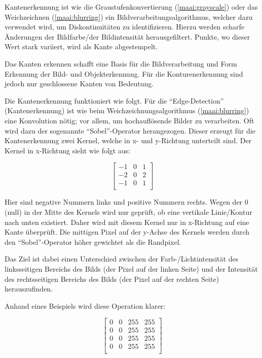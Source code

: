 Kantenerkennung ist wie die Graustufenkonvertierung (\ref{maai:grayscale}) oder das Weichzeichnen (\ref{maai:blurring}) ein Bildverarbeitungsalgorithmus, welcher dazu verwendet wird, um Diskontinuitäten zu identifizieren. Hierzu werden scharfe Änderungen der Bildfarbe/der Bildintensität herausgefiltert. Punkte, wo dieser Wert stark variiert, wird als Kante abgestempelt.

Das Kanten erkennen schafft eine Basis für die Bildverarbeitung und Form Erkennung der Bild- und Objekterkennung. Für die Konturenerkennung sind jedoch nur geschlossene Kanten von Bedeutung.

Die Kantenerkennung funktioniert wie folgt. Für die ``Edge-Detection'' (Kantenerkennung) ist wie beim Weichzeichnungsalgorithmus (\ref{maai:blurring}) eine Konvolution nötig; vor allem, um hochauflösende Bilder zu verarbeiten. Oft wird dazu der sogenannte ``Sobel''-Operator herangezogen. Dieser erzeugt für die Kantenerkennung zwei Kernel, welche in x- und y-Richtung unterteilt sind. Der Kernel in x-Richtung sieht wie folgt aus:

\[
    \left[\begin{array}{rrr}
            -1 & 0 & 1 \\
            -2 & 0 & 2 \\
            -1 & 0 & 1 \\
        \end{array}\right]
\]


Hier sind negative Nummern links und positive Nummern rechts. Wegen der 0 (null) in der Mitte des Kernels wird nur geprüft, ob eine vertikale Linie/Kontur nach unten existiert. Daher wird mit diesem Kernel nur in x-Richtung auf eine Kante überprüft. Die mittigen Pixel auf der y-Achse des Kernels werden durch den ``Sobel''-Operator höher gewichtet als die Randpixel.

Das Ziel ist dabei einen Unterschied zwischen der Farb-/Lichtintensität des linksseitigen Bereichs des Bilds (der Pixel auf der linken Seite) und der Intensität des rechtsseitigen Bereichs des Bilds (der Pixel auf der rechten Seite) herauszufinden.

Anhand eines Beispiels wird diese Operation klarer:

\[
    \left[\begin{array}{rrrr}
            0 & 0 & 255 & 255 \\
            0 & 0 & 255 & 255 \\
            0 & 0 & 255 & 255 \\
            0 & 0 & 255 & 255 \\
        \end{array}\right]
\]


